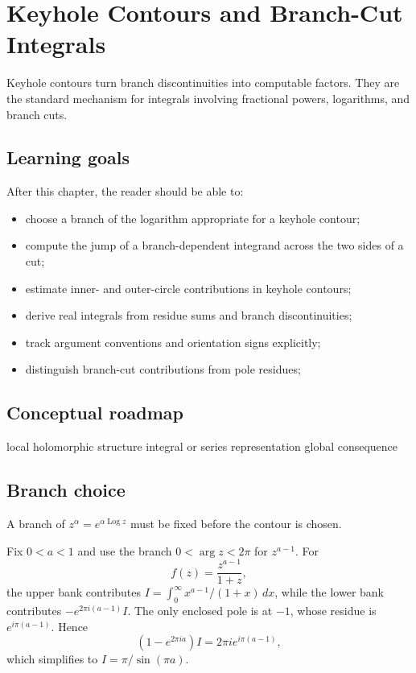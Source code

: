 \chapter{Keyhole Contours and Branch-Cut Integrals}
\label{ch:iv21}

Keyhole contours turn branch discontinuities into computable factors. They are the standard mechanism for integrals involving fractional powers, logarithms, and branch cuts.

\section*{Learning goals}
After this chapter, the reader should be able to:
\begin{itemize}
\item choose a branch of the logarithm appropriate for a keyhole contour;
\item compute the jump of a branch-dependent integrand across the two sides of a cut;
\item estimate inner- and outer-circle contributions in keyhole contours;
\item derive real integrals from residue sums and branch discontinuities;
\item track argument conventions and orientation signs explicitly;
\item distinguish branch-cut contributions from pole residues;
\end{itemize}
\section*{Conceptual roadmap}
\volroadmap
  {local holomorphic structure}
  {integral or series representation}
  {global consequence}

\section{Branch choice}
A branch of $z^\alpha=e^{\alpha\operatorname{Log} z}$ must be fixed before the contour is chosen.

\begin{example}\label{ex:iv21-expand-01}
Fix \(0<a<1\) and use the branch \(0<\arg z<2\pi\) for \(z^{a-1}\). For
\[
f(z)=\frac{z^{a-1}}{1+z},
\]
the upper bank contributes \(I=\int_0^\infty x^{a-1}/(1+x)\,dx\), while the lower bank contributes \(-e^{2\pi i(a-1)}I\). The only enclosed pole is at \(-1\), whose residue is \(e^{i\pi(a-1)}\). Hence
\[
(1-e^{2\pi ia})I=2\pi i e^{i\pi(a-1)},
\]
which simplifies to \(I=\pi/\sin(\pi a)\).
\end{example}
